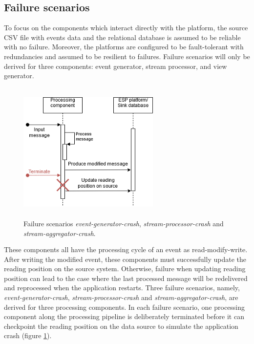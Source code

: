  
\subsection{Failure scenarios}  \label{subsection:failurescenarios}
To focus on the components which interact directly with the platform, the source CSV file with events data and the relational database is assumed to be reliable with no failure. Moreover, the platforms are configured to be fault-tolerant with redundancies and assumed to be resilient to failures.  Failure scenarios will only be derived for three components: event generator, stream processor, and view generator.

\begin{figure}[h]
	\centering
	\includegraphics[width=7cm,height=7cm]{images/reading-position-fail.png}
	\caption{Failure scenarios \emph{event-generator-crash}, \emph{stream-processor-crash} and \emph{stream-aggregator-crash}.}
	\label{fig:scenarioreadingposition}
\end{figure}

These components all have the processing cycle of an event as read-modify-write. After writing the modified event, these components must successfully update the reading position on the source system. Otherwise, failure when updating reading position can lead to the case where the last processed message will be redelivered and reprocessed when the application restarts. Three failure scenarios, namely, \emph{event-generator-crash}, \emph{stream-processor-crash} and \emph{stream-aggregator-crash}, are derived for three processing components. In each failure scenario, one processing component along the processing pipeline is deliberately terminated before it can checkpoint the reading position on the data source to simulate the application crash (figure \ref{fig:scenarioreadingposition}).




